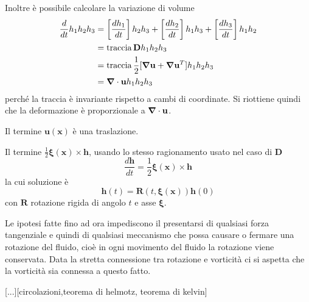 Inoltre è possibile calcolare la variazione di volume
\begin{equation}
\begin{split}
\frac{d}{dt}h_1 h_2 h_3 &= \left [ \frac{dh_1}{dt} \right ] h_2h_3 + \left [ \frac{dh_2}{dt} \right ] h_1h_3 + \left [ \frac{dh_3}{dt} \right ] h_1h_2 \\
                                        &= \operatorname{traccia} \mathbf{D} h_1 h_2 h_3  \\
                                        &= \operatorname{traccia}  \frac{1}{2} [ \boldsymbol{\nabla}\mathbf{u} + \boldsymbol{\nabla}\mathbf{u} ^T] h_1 h_2 h_3 \\ 
                                        &= \boldsymbol{\nabla} \cdot \mathbf{u} h_1 h_2 h_3
\end{split}
\end{equation}
perché la traccia è invariante rispetto a cambi di coordinate. Si riottiene quindi che la deformazione è proporzionale a $ \boldsymbol{\nabla} \cdot \mathbf{u}$.

Il termine $\mathbf{u}(\mathbf{x})$ è una traslazione.

Il termine $\frac{1}{2}\boldsymbol{\xi}(\mathbf{x})\times\mathbf{h}$, usando lo stesso ragionamento usato nel caso di $\mathbf{D}$
$$\frac{d\mathbf{h}}{dt}=\frac{1}{2}\boldsymbol{\xi}(\mathbf{x})\times\mathbf{h}$$
la cui soluzione è
$$\mathbf{h}(t)=\mathbf{R}(t,\boldsymbol{\xi}(\mathbf{x}))\mathbf{h}(0)$$
con $\mathbf{R}$ rotazione rigida di angolo $t$ e asse $\boldsymbol{\xi}$. 

Le ipotesi fatte fino ad ora impediscono il presentarsi di qualsiasi forza tangenziale e quindi di qualsiasi meccanismo che possa causare o fermare una rotazione del fluido, cioè in ogni movimento del fluido la rotazione viene conservata. Data la stretta connessione tra rotazione e vorticità ci si aspetta che la vorticità sia connessa a questo fatto. 

[...][circolazioni,teorema di helmotz, teorema di kelvin]

